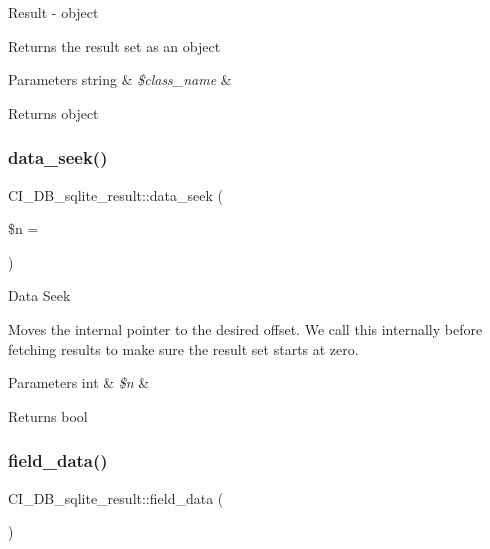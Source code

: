 Result -\/ object

Returns the result set as an object


\begin{DoxyParams}[1]{Parameters}
string & {\em \$class\+\_\+name} & \\
\hline
\end{DoxyParams}
\begin{DoxyReturn}{Returns}
object 
\end{DoxyReturn}
\mbox{\label{class_c_i___d_b__sqlite__result_a077f498a820453d333ef7b05c0c414e2}} 
\subsubsection{\texorpdfstring{data\+\_\+seek()}{data\_seek()}}
{\footnotesize\ttfamily C\+I\+\_\+\+D\+B\+\_\+sqlite\+\_\+result\+::data\+\_\+seek (\begin{DoxyParamCaption}\item[{}]{\$n = {} }\end{DoxyParamCaption})}

Data Seek

Moves the internal pointer to the desired offset. We call this internally before fetching results to make sure the result set starts at zero.


\begin{DoxyParams}[1]{Parameters}
int & {\em \$n} & \\
\hline
\end{DoxyParams}
\begin{DoxyReturn}{Returns}
bool 
\end{DoxyReturn}
\mbox{\label{class_c_i___d_b__sqlite__result_a6daba05322a6b3fe8965f1a871375722}} 
\subsubsection{\texorpdfstring{field\+\_\+data()}{field\_data()}}
{\footnotesize\ttfamily C\+I\+\_\+\+D\+B\+\_\+sqlite\+\_\+result\+::field\+\_\+data (\begin{DoxyParamCaption}{ }\end{DoxyParamCaption})}

